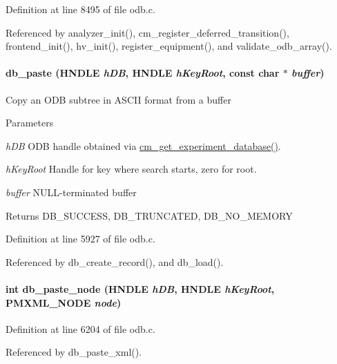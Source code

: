 Definition at line 8495 of file odb.c.

Referenced by analyzer\_\-init(), cm\_\-register\_\-deferred\_\-transition(), frontend\_\-init(), hv\_\-init(), register\_\-equipment(), and validate\_\-odb\_\-array().
\paragraph[{db\_\-paste}]{ db\_\-paste (HNDLE {\em hDB}, \/  HNDLE {\em hKeyRoot}, \/  const char $\ast$ {\em buffer})}\hfill\label{group__odbfunctionc_gac1bf8d648ef2ddb1ac6243e5e11dedf2}
Copy an ODB subtree in ASCII format from a buffer 
\begin{DoxyParams}{Parameters}
\item[{\em hDB}]ODB handle obtained via \hyperlink{group__cmfunctionc_ga16b33b70783a3f5ba98b4094149d12b7}{cm\_\-get\_\-experiment\_\-database()}. \item[{\em hKeyRoot}]Handle for key where search starts, zero for root. \item[{\em buffer}]NULL-\/terminated buffer \end{DoxyParams}
\begin{DoxyReturn}{Returns}
DB\_\-SUCCESS, DB\_\-TRUNCATED, DB\_\-NO\_\-MEMORY 
\end{DoxyReturn}


Definition at line 5927 of file odb.c.

Referenced by db\_\-create\_\-record(), and db\_\-load().
\paragraph[{db\_\-paste\_\-node}]{\setlength{\rightskip}{0pt plus 5cm}int db\_\-paste\_\-node (HNDLE {\em hDB}, \/  HNDLE {\em hKeyRoot}, \/  PMXML\_\-NODE {\em node})}\hfill\label{group__odbfunctionc_ga4c389e553182916bd3c311d1f07d6923}


Definition at line 6204 of file odb.c.

Referenced by db\_\-paste\_\-xml().
